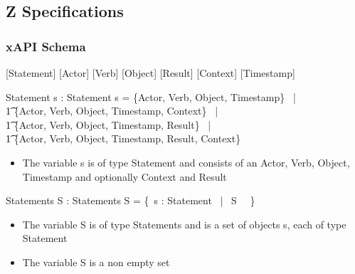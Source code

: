 \documentclass{article}
\begin{document}
  \subsection{Z Specifications}
  \subsubsection{xAPI Schema}
  [Statement]
  [Actor]
  [Verb]
  [Object]
  [Result]
  [Context]
  [Timestamp]
  \begin{schema}{Statement}
    s : Statement
    \where
    s = \{Actor, Verb, Object, Timestamp\} \, |
    \\ \t1 \{Actor, Verb, Object, Timestamp, Context\} \, |
    \\ \t1 \{Actor, Verb, Object, Timestamp, Result\} \, |
    \\ \t1 \{Actor, Verb, Object, Timestamp, Result, Context\}
  \end{schema}
  \begin{itemize}
  \item The variable s is of type Statement and consists of an Actor, Verb, Object, Timestamp and optionally Context and Result
  \end{itemize}
  \begin{schema}{Statements}
    S : Statements
    \where
    S = \{~s : Statement \, | \, S \, \neg \, \emptyset\} \\
  \end{schema}
  \begin{itemize}
  \item The variable S is of type Statements and is a set of objects s, each of type Statement
  \item The variable S is a non empty set
  \end{itemize}
\end{document}
